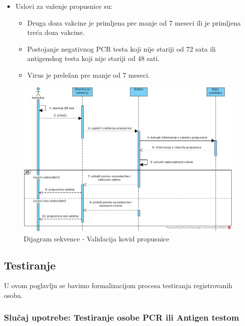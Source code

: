 \documentclass[titlepage]{article}
\begin{document}
\begin{itemize}
        \begin{itemize}
            \item Uslovi za važenje propusnice su:
                \begin{itemize}
                    \item Druga doza vakcine je primljena pre manje od 7 meseci ili  je primljena treća doza vakcine.
                    \item Postojanje negativnog PCR testa koji nije stariji od 72 sata ili antigenskog testa koji nije stariji od 48 sati.
                    \item Virus je preležan pre manje od 7 meseci.
                \end{itemize}
        \end{itemize}
\end{itemize}

\begin{figure}[H]
\centering
\includegraphics[scale=0.5]{Validacija_propusnice}
\caption{Dijagram sekvence - Validacija kovid propusnice}
\label{slk:validacija}
\end{figure}

\subsection{Testiranje}

U ovom poglavlju se bavimo formalizacijom procesa testiranja registrovanih osoba.

\subsubsection{Slučaj upotrebe: Testiranje osobe PCR ili Antigen testom}
\end{document}
